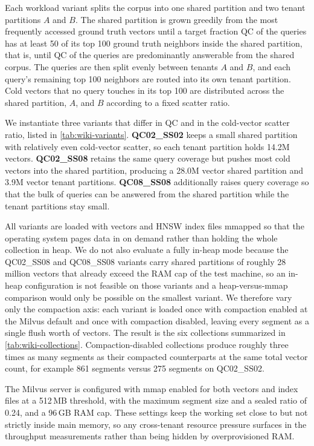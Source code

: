  Each workload variant splits the
corpus into one shared partition and two tenant partitions $A$ and
$B$. The shared partition is grown greedily from the most frequently
accessed ground truth vectors until a target fraction $\mathrm{QC}$
of the queries has at least 50 of its top 100 ground truth neighbors
inside the shared partition, that is, until $\mathrm{QC}$ of the
queries are predominantly answerable from the shared corpus. The
queries are then split evenly between tenants $A$ and $B$, and each
query's remaining top 100 neighbors are routed into its own tenant
partition. Cold vectors that no query touches in its top 100 are
distributed across the shared partition, $A$, and $B$ according to a
fixed scatter ratio.

 We instantiate three variants that
differ in $\mathrm{QC}$ and in the cold-vector scatter ratio, listed
in \autoref{tab:wiki-variants}. \textbf{QC02\_SS02} keeps a small
shared partition with relatively even cold-vector scatter, so each
tenant partition holds 14.2M vectors. \textbf{QC02\_SS08} retains the
same query coverage but pushes most cold vectors into the shared
partition, producing a 28.0M vector shared partition and 3.9M vector
tenant partitions. \textbf{QC08\_SS08} additionally raises query
coverage so that the bulk of queries can be answered from the
shared partition while the tenant partitions stay small.

 All variants are loaded with
vectors and HNSW index files mmapped so that the operating system
pages data in on demand rather than holding the whole collection in
heap. We do not also evaluate a fully in-heap mode because the
QC02\_SS08 and QC08\_SS08 variants carry shared partitions of
roughly 28 million vectors that already exceed the RAM cap of the
test machine, so an in-heap configuration is not feasible on those
variants and a heap-versus-mmap comparison would only be possible
on the smallest variant. We therefore vary only the compaction
axis: each variant is loaded once with compaction enabled at the
Milvus default and once with compaction disabled, leaving every
segment as a single flush worth of vectors. The result is the six
collections summarized in \autoref{tab:wiki-collections}.
Compaction-disabled collections produce roughly three times as many
segments as their compacted counterparts at the same total vector
count, for example 861 segments versus 275 segments on QC02\_SS02.

 The Milvus server is configured with
mmap enabled for both vectors and index files at a 512\,MB threshold, with the maximum segment size and a sealed ratio
of 0.24, and a 96\,GB RAM cap. These settings keep the
working set close to but not strictly inside main memory, so any
cross-tenant resource pressure surfaces in the throughput
measurements rather than being hidden by overprovisioned RAM.
